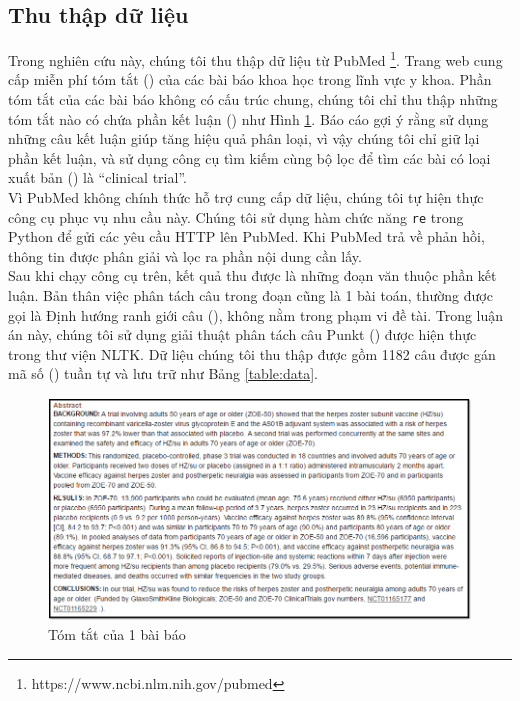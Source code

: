 \subsection*{Thu thập dữ liệu}
Trong nghiên cứu này, chúng tôi thu thập dữ liệu từ  PubMed \footnote{https://www.ncbi.nlm.nih.gov/pubmed}. Trang web cung cấp miễn phí tóm tắt () của các bài báo khoa học trong lĩnh vực y khoa. Phần tóm tắt của các bài báo không có cấu trúc chung, chúng tôi chỉ thu thập những tóm tắt nào có chứa phần kết luận () như Hình \ref{fig:bai-bao-mau}. Báo cáo \cite{sarker2011outcome} gợi ý rằng sử dụng những câu kết luận giúp tăng hiệu quả phân loại, vì vậy chúng tôi chỉ giữ lại phần kết luận, và sử dụng công cụ tìm kiếm cùng bộ lọc để tìm các bài có loại xuất bản () là ``clinical trial''.\\

Vì  PubMed không chính thức hỗ trợ cung cấp dữ liệu, chúng tôi tự hiện thực công cụ phục vụ nhu cầu này. Chúng tôi sử dụng hàm chức năng \texttt{re} trong Python để gửi các yêu cầu HTTP lên  PubMed. Khi PubMed trả về phản hồi, thông tin được phân giải và lọc ra phần nội dung cần lấy.\\

Sau khi chạy công cụ trên, kết quả thu được là những đoạn văn thuộc phần kết luận. Bản thân việc phân tách câu trong đoạn cũng là 1 bài toán, thường được gọi là Định hướng ranh giới câu (), không nằm trong phạm vi đề tài. Trong luận án này, chúng tôi sử dụng giải thuật phân tách câu Punkt () \cite{kiss2006unsupervised} được hiện thực trong thư viện NLTK. Dữ liệu chúng tôi thu thập được gồm 1182 câu được gán mã số () tuần tự và lưu trữ như Bảng \ref{table:data}.
\begin{figure}[h]
\centering
\includegraphics[scale=0.7]{../hinh/bai_bao_mau.png}
\caption{Tóm tắt của 1 bài báo} \label{fig:bai-bao-mau}
\end{figure}

